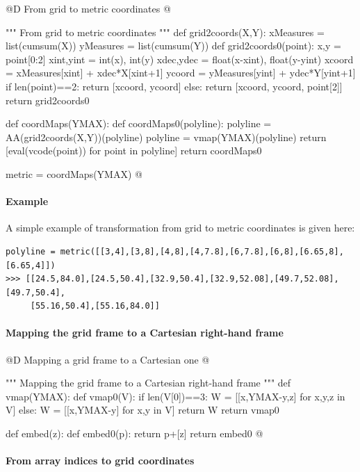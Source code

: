 \documentclass[11pt,oneside]{article}    %
\begin{document}
@D From grid to metric coordinates
@{""" From grid to metric coordinates """
def grid2coords(X,Y):
    xMeasures = list(cumsum(X))
    yMeasures = list(cumsum(Y))
    def grid2coords0(point):
        x,y = point[0:2]
        xint,yint = int(x), int(y)
        xdec,ydec = float(x-xint), float(y-yint)
        xcoord = xMeasures[xint] + xdec*X[xint+1]
        ycoord = yMeasures[yint] + ydec*Y[yint+1]
        if len(point)==2: return [xcoord, ycoord]
        else: return [xcoord, ycoord, point[2]]
    return grid2coords0

def coordMaps(YMAX):
    def coordMaps0(polyline):
        polyline = AA(grid2coords(X,Y))(polyline)
        polyline = vmap(YMAX)(polyline)
        return [eval(vcode(point)) for point in polyline]
    return coordMaps0

metric = coordMaps(YMAX)
@}


\paragraph{Example} 
A simple example of transformation from grid to metric coordinates is given here:
{\small 
\begin{verbatim}
polyline = metric([[3,4],[3,8],[4,8],[4,7.8],[6,7.8],[6,8],[6.65,8],[6.65,4]])
>>> [[24.5,84.0],[24.5,50.4],[32.9,50.4],[32.9,52.08],[49.7,52.08],[49.7,50.4],
     [55.16,50.4],[55.16,84.0]]
\end{verbatim}}


\paragraph{Mapping the grid frame to a Cartesian right-hand frame}
@D Mapping a grid frame to a Cartesian one
@{""" Mapping the grid frame to a Cartesian right-hand frame """
def vmap(YMAX):
    def vmap0(V):
        if len(V[0])==3: W = [[x,YMAX-y,z] for x,y,z in V]
        else: W = [[x,YMAX-y] for x,y in V]
        return W
    return vmap0
                
def embed(z):
    def embed0(p): 
        return p+[z]
    return embed0
@}


\paragraph{From array indices to grid coordinates}
\end{document}
